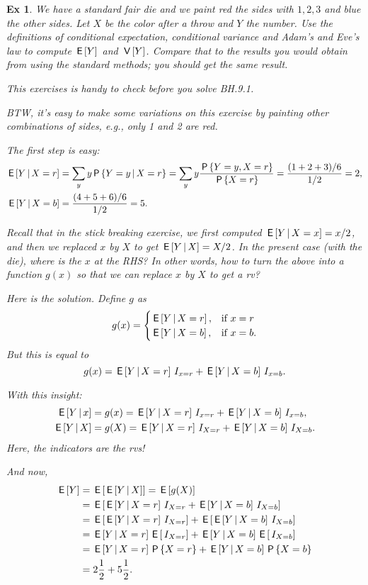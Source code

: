 \documentclass[a4paper,11pt]{article}
\newtheorem{exercise}[theorem]{Ex}
\begin{document}
\begin{exercise}
We have a standard fair die and we paint red the sides with $1, 2, 3$ and blue the other sides.
Let $X$ be the color after a throw and $Y$ the number.
Use the definitions of conditional expectation, conditional variance and Adam's and Eve's law to compute $\,\mathsf{E}\left[Y\right]$ and $\,\mathsf{V}\left[Y\right]$.
Compare that to the results you would obtain from using the standard methods; you should get the same result.

This exercises is handy to check before you solve BH.9.1.


BTW, it's easy to make some variations on this exercise by painting other combinations of sides, e.g., only 1 and 2 are red.
\begin{solution}
The first step is easy:
\begin{align}
\,\mathsf{E}\left[Y\,\middle|\, X=r\right] &= \sum_{y} y \,\mathsf{P}\left\{Y=y\,\middle|\, X=r\right\} = \sum_{y} y \frac{\,\mathsf{P}\left\{Y=y,  X=r\right\}}{\,\mathsf{P}\left\{X=r\right\}} = \frac{(1+2+3)/6}{1/2}  = 2, \\
\,\mathsf{E}\left[Y\,\middle|\, X=b\right] &= \frac{(4 + 5+ 6)/6}{1/2}  = 5.
\end{align}

Recall that in the stick breaking exercise, we first computed $\,\mathsf{E}\left[Y\,\middle|\, X = x\right] = x/2$, and then we replaced $x$ by $X$ to get $\,\mathsf{E}\left[Y\,\middle|\, X\right] = X/2$. In the present case (with the die), where is the $x$ at the RHS? In other words, how to turn the above into a function $g(x)$ so that we can replace $x$ by $X$ to get a rv?


Here is the solution. Define $g$ as
\begin{equation}
  \label{eq:111}
  g(x) =
  \begin{cases}
    \,\mathsf{E}\left[Y\,\middle|\, X=r\right], & \text{if } x = r \\
    \,\mathsf{E}\left[Y\,\middle|\, X=b\right], & \text{if } x = b.
  \end{cases}
\end{equation}
But this is equal to
\begin{equation}
  \label{eq:112}
  g(x) = \,\mathsf{E}\left[Y\,\middle|\, X=r\right] \,I_{x=r} + \,\mathsf{E}\left[Y\,\middle|\, X=b\right] \,I_{x=b}.
\end{equation}

With this insight:
\begin{align*}
\,\mathsf{E}\left[Y\,\middle|\, x\right] &=  g(x) = \,\mathsf{E}\left[Y\,\middle|\, X=r\right] \,I_{x=r} + \,\mathsf{E}\left[Y\,\middle|\, X=b\right] \,I_{x=b}, \\
\,\mathsf{E}\left[Y\,\middle|\, X\right] &=  g(X) = \,\mathsf{E}\left[Y\,\middle|\, X=r\right] \,I_{X=r} + \,\mathsf{E}\left[Y\,\middle|\, X=b\right] \,I_{X=b}.
\end{align*}
Here, the indicators are the rvs!

And now,
\begin{align}
\,\mathsf{E}\left[Y\right] &= \,\mathsf{E}\left[\,\mathsf{E}\left[Y\,\middle|\, X\right]\right] = \,\mathsf{E}\left[g(X)\right] \\
&=\,\mathsf{E}\left[\,\mathsf{E}\left[Y\,\middle|\, X=r\right] \,I_{X=r} + \,\mathsf{E}\left[Y\,\middle|\, X=b\right] \,I_{X=b}\right]\\
&=\,\mathsf{E}\left[\,\mathsf{E}\left[Y\,\middle|\, X=r\right] \,I_{X=r}\right] + \,\mathsf{E}\left[\,\mathsf{E}\left[Y\,\middle|\, X=b\right] \,I_{X=b}\right]\\
&=\,\mathsf{E}\left[Y\,\middle|\, X=r\right] \,\mathsf{E}\left[\,I_{X=r}\right] + \,\mathsf{E}\left[Y\,\middle|\, X=b\right] \,\mathsf{E}\left[\,I_{X=b}\right]\\
&=\,\mathsf{E}\left[Y\,\middle|\, X=r\right] \,\mathsf{P}\left\{X=r\right\} + \,\mathsf{E}\left[Y\,\middle|\, X=b\right] \,\mathsf{P}\left\{X=b\right\}\\
&=2 \frac{1}{2}+ 5 \frac{1}{2}.
\end{align}


\end{solution}
\end{exercise}
\end{document}
